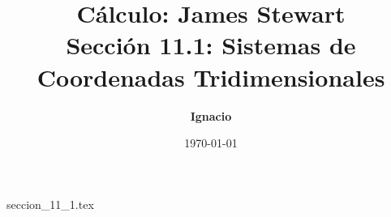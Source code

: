 \documentclass[11pt,spanish,oneside]{report}
\title{\textbf{Cálculo: James Stewart} \\ \Large Sección 11.1: Sistemas de Coordenadas Tridimensionales}
\author{\textbf{Ignacio}}
\date{\today}
\begin{document}
\maketitle

{seccion_11_1.tex}
\end{document}
